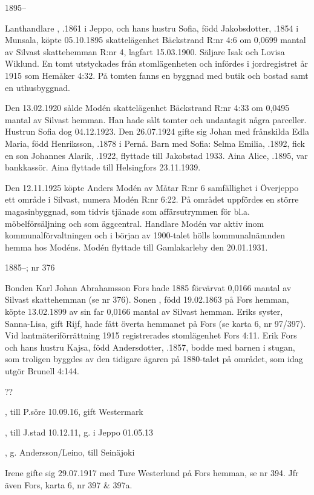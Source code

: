  1895--

Lanthandlare , .1861 i Jeppo, och hans hustru Sofia, född Jakobsdotter, .1854 i Munsala, köpte 05.10.1895 skattelägenhet Bäckstrand R:nr 4:6 om 0,0699 mantal av Silvast skattehemman R:nr 4, lagfart 15.03.1900. Säljare Isak och Lovisa Wiklund. En tomt utstyckades från stomlägenheten och infördes i jordregistret år 1915 som Hemåker 4:32. På tomten fanns en byggnad med butik och bostad samt en uthusbyggnad.

Den 13.02.1920 sålde Modén skattelägenhet Bäckstrand R:nr 4:33 om 0,0495 mantal av Silvast hemman. Han hade sålt tomter och undantagit några parceller. Hustrun Sofia dog 04.12.1923. Den 26.07.1924 gifte sig Johan med frånskilda Edla Maria, född Henriksson, .1878 i Pernå.
Barn med Sofia:
Selma Emilia, .1892, fick en son Johannes Alarik, .1922, flyttade till Jakobstad 1933.
Aina Alice, .1895, var bankkassör. Aina flyttade till Helsingfors 23.11.1939.

Den 12.11.1925 köpte Anders Modén av Måtar R:nr 6 samfällighet i Överjeppo ett område i Silvast, numera Modén R:nr 6:22. På området uppfördes en större magasinbyggnad, som tidvis tjänade som affärsutrymmen för bl.a. möbelförsäljning och som äggcentral. Handlare Modén var aktiv inom kommunalförvaltningen och i början av 1900-talet hölls kommunalnämnden hemma hos Modéns. Modén flyttade till Gamlakarleby den 20.01.1931.


 1885--; nr 376

Bonden Karl Johan Abrahamsson Fors hade 1885 förvärvat 0,0166 mantal av Silvast skattehemman (se nr 376).
Sonen , född 19.02.1863 på Fors hemman, köpte 13.02.1899 av sin far 0,0166 mantal av Silvast hemman. Eriks syster, Sanna-Lisa, gift Rijf, hade fått överta hemmanet på Fors (se karta 6, nr 97/397). Vid lantmäteriförrättning 1915 registrerades stomlägenhet Fors 4:11. Erik Fors och hans hustru Kajsa, född Andersdotter, .1857, bodde med barnen i stugan, som troligen byggdes av den tidigare ägaren på 1880-talet på området, som idag utgör Brunell 4:144.
\begin{jhchildren}
  \item {} ??
  \item {}, till P.söre 10.09.16, gift Westermark
  \item {}, till J.stad 10.12.11, g. i Jeppo 01.05.13
  \item {}, g. Andersson/Leino, till Seinäjoki
\end{jhchildren}
Irene gifte sig 29.07.1917 med Ture Westerlund på Fors hemman, se nr 394. Jfr även Fors, karta 6, nr 397 \& 397a.

